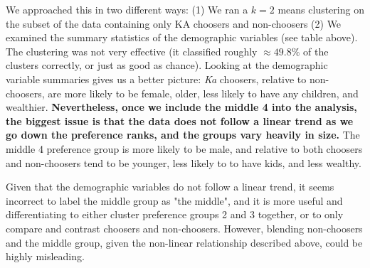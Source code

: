 \documentclass[10pt, oneside,spanish]{article}
\begin{document}
We approached this in two different ways: (1) We ran a $k=2$ means clustering on the subset of the data containing only KA choosers and non-choosers (2) We examined the summary statistics of the demographic variables (see table above). The clustering was not very effective (it classified roughly $\approx 49.8 \%$ of the clusters correctly, or just as good as chance). Looking at the demographic variable summaries gives us a better picture: \textit{Ka} choosers, relative to non-choosers, are more likely to be female, older, less likely to have any children, and wealthier. \textbf{Nevertheless, once we include the middle 4 into the analysis, the biggest issue is that the data does not follow a linear trend as we go down the preference ranks, and the groups vary heavily in size.} The middle 4 preference group is more likely to be male, and relative to both choosers and non-choosers tend to be younger, less likely to to have kids, and less wealthy. 

Given that the demographic variables do not follow a linear trend, it seems incorrect to label the middle group as "the middle", and it is more useful and differentiating to either cluster preference groups 2 and 3 together, or to only compare and contrast choosers and non-choosers. However, blending non-choosers and the middle group, given the non-linear relationship described above, could be highly misleading.

\pagebreak
\end{document}
